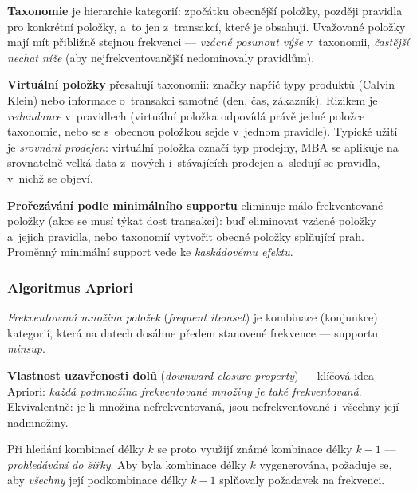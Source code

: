 \documentclass[11pt,a4paper]{article}
\theoremstyle{definition}
\begin{document}
\textbf{Taxonomie} je hierarchie kategorií: zpočátku obecnější položky, později pravidla pro
konkrétní položky, a~to jen z~transakcí, které je obsahují. Uvažované položky mají mít
přibližně stejnou frekvenci --- \emph{vzácné posunout výše} v~taxonomii, \emph{častější nechat
níže} (aby nejfrekventovanější nedominovaly pravidlům).

\textbf{Virtuální položky} přesahují taxonomii: značky napříč typy produktů (Calvin Klein)
nebo informace o~transakci samotné (den, čas, zákazník). Rizikem je \emph{redundance}
v~pravidlech (virtuální položka odpovídá právě jedné položce taxonomie, nebo se s~obecnou
položkou sejde v~jednom pravidle). Typické užití je \emph{srovnání prodejen}: virtuální
položka označí typ prodejny, MBA se aplikuje na srovnatelně velká data z~nových
i~stávajících prodejen a~sledují se pravidla, v~nichž se objeví.

\textbf{Prořezávání podle minimálního supportu} eliminuje málo frekventované položky (akce se
musí týkat dost transakcí): buď eliminovat vzácné položky a~jejich pravidla, nebo taxonomií
vytvořit obecné položky splňující prah. Proměnný minimální support vede ke \emph{kaskádovému
efektu}.

\subsubsection{Algoritmus Apriori}

\begin{defbox}
\emph{Frekventovaná množina položek} (\emph{frequent itemset}) je kombinace (konjunkce)
kategorií, která na datech dosáhne předem stanovené frekvence --- supportu \emph{minsup}.

\textbf{Vlastnost uzavřenosti dolů} (\emph{downward closure property}) --- klíčová idea
Apriori: \emph{každá podmnožina frekventované množiny je také frekventovaná}. Ekvivalentně:
je-li množina nefrekventovaná, jsou nefrekventované i~všechny její nadmnožiny.

Při hledání kombinací délky $k$ se proto využijí známé kombinace délky $k-1$ ---
\emph{prohledávání do šířky}. Aby byla kombinace délky $k$ vygenerována, požaduje se, aby
\emph{všechny} její podkombinace délky $k-1$ splňovaly požadavek na frekvenci.
\end{defbox}
\end{document}
